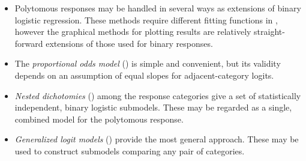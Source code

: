 \begin{itemize}
\item Polytomous responses may be handled in several ways as extensions of binary
logistic regression.  These methods require different fitting functions in \R,
however the graphical methods for plotting results are relatively straight-forward
extensions of those used for binary responses.
 \item The \emph{proportional odds model} () is simple and convenient, but its validity
depends
on an assumption of equal slopes for adjacent-category logits.
 \item \emph{Nested dichotomies} () among the response categories give a set of statistically independent, binary logistic submodels.
These may be regarded as a single, combined model for the polytomous response.
 \item \emph{Generalized logit models} () provide the most general approach. These
 may be used to construct submodels comparing any pair of categories.

\end{itemize}

